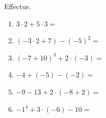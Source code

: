 %
%
	Effectue.
	\begin{enumerate}[cols=2, itemsep=4cm]
		\item \(3\cdot 2 + 5 \cdot 3 =\)
		\item \((-3 \cdot 2 + 7) - (-5)^2=\)
		\item \((-7+10)^3 + 2 \cdot (-3)=\)
		\item \(-4 + (-5) - (-2)=\)
		\item \(-9 - 13 + 2 \cdot (-8 + 2)=\)
		\item \(-1^4 + 3 \cdot (-6) - 10=\)
	\end{enumerate}	
    \vspace{4cm}
